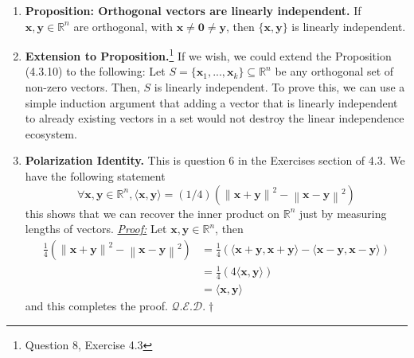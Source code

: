 \documentclass[oneside, 12pt]{book}
\newcommand{\settag}[1]{\renewcommand{\theenumi}{#1}}
\newcommand{\R}{\mathbb{R}}
\newcommand{\qed}{\hfill $\mathcal{Q}.\mathcal{E}.\mathcal{D}.\dagger$}
\newcommand{\tbf}[1]{\textbf{#1}}
\newcommand{\tit}[1]{\textit{#1}}
\newcommand{\proof}{\tit{\underline{Proof:}}} %
\newcommand{\norm}[1]{\left\lVert#1\right\rVert}
\newcommand{\para}[1]{\item \tbf{#1}}
\newcommand{\vx}{\mathbf{x}}
\newcommand{\vy}{\mathbf{y}}
\newcommand{\vzero}{\mathbf{0}}
\begin{document}
\begin{enumerate}
    \settag{4.3.10}
    \para{Proposition: Orthogonal vectors are linearly independent.} If $\vx,\vy \in \R^n$ 
    are orthogonal, with $\vx \neq \vzero \neq \vy$, then $\{\vx,\vy\}$ is linearly independent.

    \settag{4.3.10*}
    \para{Extension to Proposition.}\footnote{Question 8, Exercise 4.3} If we wish, we could extend the Proposition (4.3.10) to the
    following: Let $S = \{\vx_1,...,\vx_k\}\subseteq \R^n$ be any orthogonal set of non-zero vectors. 
    Then, $S$ is linearly independent. To prove this, we can use a simple induction argument that
    adding a vector that is linearly independent to already existing vectors in a set would not
    destroy the linear independence ecosystem.

    \settag{4.3.*}
    \para{Polarization Identity.} This is question 6 in the Exercises section of 4.3. We have the
    following statement
    \begin{equation*}
        \forall \vx,\vy\in \R^n, \langle \vx,\vy\rangle = (1/4)\left( \norm{\vx+\vy}^2 - \norm{\vx-\vy}^2 \right)
    \end{equation*}
    this shows that we can recover the inner product on $\R^n$ just by measuring lengths of vectors.\newline
    \proof \newline
    Let $\vx,\vy\in \R^n$, then
    \begin{align*}
        \frac{1}{4}\left( \norm{\vx+\vy}^2 - \norm{\vx-\vy}^2\right)
        &= \frac{1}{4}\left(\langle \vx+\vy,\vx+\vy\rangle - \langle \vx-\vy,\vx-\vy\rangle\right)\\
        &= \frac{1}{4}\left(4\langle \vx,\vy\rangle \right) \\
        &= \langle \vx,\vy\rangle
    \end{align*}
    and this completes the proof. \qed

\end{enumerate}
\end{document}
